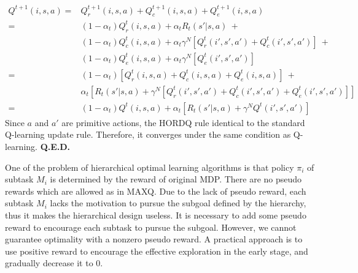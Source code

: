 \begin{align*}
    Q^{t+1}(i, s, a) = &Q_r^{t+1}(i, s, a) + Q_c^{t+1}(i, s, a) + Q_e^{t+1}(i, s, a) \\
                     = &(1 - \alpha_t){Q}_r^{t}(i, s, a) + \alpha_t R_t(s'| s, a) \ +\\
                       &(1 - \alpha_t){Q}_c^{t}(i, s, a) + \alpha_t \gamma^N[{Q}_r^{t}(i', s', a') + {Q}_c^t(i', s', a')] \ +\\
                       &(1 - \alpha_t){Q}_e^{t}(i, s, a) + \alpha_t \gamma^N[{Q}_e^{t}(i', s', a')]\\
                      =&(1 - \alpha_t)[{Q}_r^{t}(i, s, a) + {Q}_c^{t}(i, s, a) + {Q}_e^{t}(i, s, a)] \ +\\
                       &\alpha_t[ R_t(s'| s, a) + \gamma^N[{Q}_r^{t}(i', s', a') + {Q}_c^t(i', s', a') + {Q}_e^{t}(i', s', a')]] \\
                      =&(1 - \alpha_t) {Q}^{t}(i, s, a) + \alpha_t[ R_t(s'| s, a) + \gamma^N  {Q}^{t}(i', s', a') ]
\end{align*}
    Since $a$ and $a'$ are primitive actions, the HORDQ rule identical to the standard Q-learning update rule.
    Therefore, it converges under the same condition as Q-learning. \textbf{Q.E.D.}

One of the problem of hierarchical optimal learning algorithms is that policy $\pi_i$ of subtask $M_i$
is determined by the reward of original MDP. There are no pseudo rewards which are allowed as
in MAXQ. Due to the lack of pseudo reward, each subtask $M_i$ lacks the motivation to 
pursue the subgoal defined by the hierarchy, thus it makes the hierarchical 
design useless. It is necessary to add some pseudo reward to encourage each subtask to pursue 
the subgoal. However, we cannot guarantee optimality with a nonzero pseudo reward.
A practical approach is to use positive reward to encourage the effective exploration
in the early stage, and gradually decrease it to 0. 


